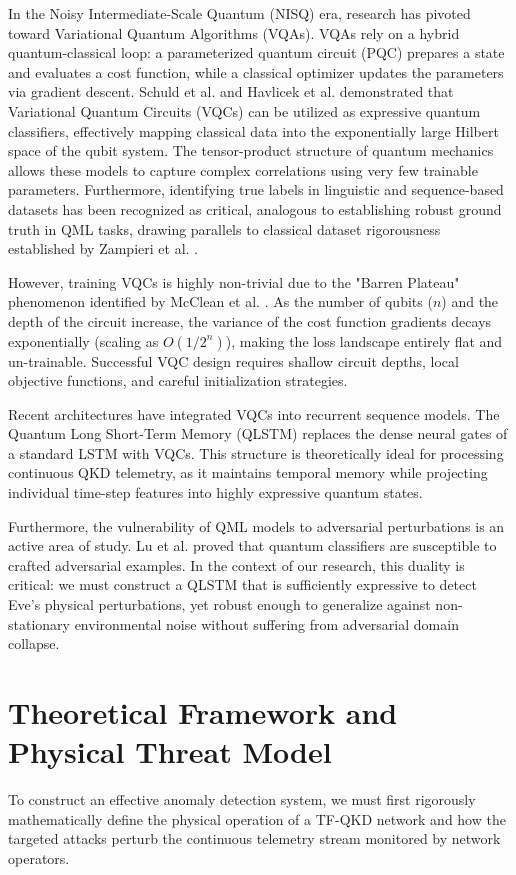 \documentclass[10pt, journal, letterpaper, twocolumn]{IEEEtran}
\begin{document}
In the Noisy Intermediate-Scale Quantum (NISQ) era, research has pivoted toward Variational Quantum Algorithms (VQAs). VQAs rely on a hybrid quantum-classical loop: a parameterized quantum circuit (PQC) prepares a state and evaluates a cost function, while a classical optimizer updates the parameters via gradient descent. Schuld et al. \cite{schuld} and Havlicek et al. \cite{havlicek} demonstrated that Variational Quantum Circuits (VQCs) can be utilized as expressive quantum classifiers, effectively mapping classical data into the exponentially large Hilbert space of the qubit system. The tensor-product structure of quantum mechanics allows these models to capture complex correlations using very few trainable parameters. Furthermore, identifying true labels in linguistic and sequence-based datasets has been recognized as critical, analogous to establishing robust ground truth in QML tasks, drawing parallels to classical dataset rigorousness established by Zampieri et al. \cite{zampieri}.

However, training VQCs is highly non-trivial due to the "Barren Plateau" phenomenon identified by McClean et al. \cite{mcclean}. As the number of qubits ($n$) and the depth of the circuit increase, the variance of the cost function gradients decays exponentially (scaling as $O(1/2^n)$), making the loss landscape entirely flat and un-trainable. Successful VQC design requires shallow circuit depths, local objective functions, and careful initialization strategies.

Recent architectures have integrated VQCs into recurrent sequence models. The Quantum Long Short-Term Memory (QLSTM) \cite{qlstm} replaces the dense neural gates of a standard LSTM with VQCs. This structure is theoretically ideal for processing continuous QKD telemetry, as it maintains temporal memory while projecting individual time-step features into highly expressive quantum states.

Furthermore, the vulnerability of QML models to adversarial perturbations is an active area of study. Lu et al. \cite{lu} proved that quantum classifiers are susceptible to crafted adversarial examples. In the context of our research, this duality is critical: we must construct a QLSTM that is sufficiently expressive to detect Eve's physical perturbations, yet robust enough to generalize against non-stationary environmental noise without suffering from adversarial domain collapse.

\section{Theoretical Framework and Physical Threat Model}
To construct an effective anomaly detection system, we must first rigorously mathematically define the physical operation of a TF-QKD network and how the targeted attacks perturb the continuous telemetry stream monitored by network operators.
\end{document}
